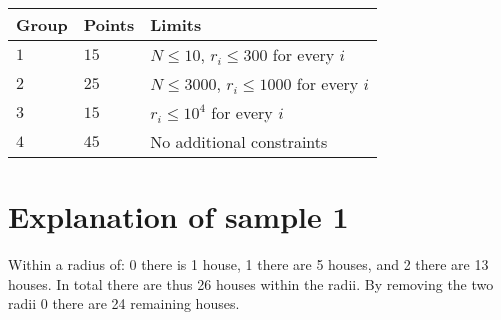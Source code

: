 \noindent
\begin{tabular}{| l | l | l |}
\hline
  Group & Points & Limits \\ \hline
  $1$    & $15$       &  $N \leq 10$, $r_i \leq 300$ for every $i$  \\ \hline 
  $2$    & $25$       &  $N \leq 3000$, $r_i \leq 1000$ for every $i$ \\ \hline
  $3$    & $15$       &  $r_i \leq 10^4$ for every $i$ \\ \hline
  $4$    & $45$       &  No additional constraints \\ \hline
\end{tabular}

\section*{Explanation of sample 1}
\noindent
Within a radius of: 0 there is 1 house, 1 there are 5 houses, and 2 there are 13 houses. In total
there are thus 26 houses within the radii. By removing the two radii 0 there are 24 remaining
houses.
